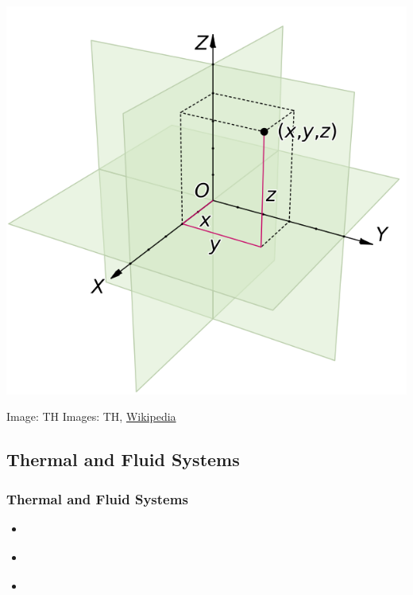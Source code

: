 \documentclass[fleqn]{beamer} %
\newcommand{\sectionIIIsubsectionIIItitle}{Thermal and Fluid Systems}
\begin{document}
\begin{frame}
\begin{multicols}{2}
				 \includegraphics[scale=0.17]{images/cartesian_3d.png}
				\end{multicols}
				{\tiny Image: TH\hspace{60mm} Images: TH, \href{https://en.wikipedia.org/wiki/Cartesian_coordinate_system}{Wikipedia} }

				\btVFill
			\end{frame}

		\subsection{\sectionIIIsubsectionIIItitle}\label{sectionIIIsubsectionIII}

			\begin{frame}
				\frametitle{\sectionIIIsubsectionIIItitle}
				\bigskip
				
				\begin{itemize}
					\item \underline{\hspace{50mm}} \vspcc
					\item \underline{\hspace{50mm}} \vspcc
					\item \underline{\hspace{50mm}} \vspcc
				\end{itemize}	

				\btVFill
			\end{frame}
\end{document}
